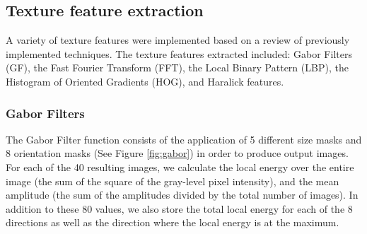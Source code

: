 \subsection{Texture feature extraction}

A variety of texture features were implemented based on a review of previously implemented techniques.
The texture features extracted included: Gabor Filters (GF), the Fast Fourier Transform (FFT), the Local Binary Pattern (LBP), the Histogram of Oriented Gradients (HOG), and Haralick features.

\subsubsection{Gabor Filters}

The Gabor Filter function consists of the application of 5 different size masks and 8 orientation masks (See Figure \ref{fig:gabor}) in order to produce output images. For each of the 40 resulting images, we calculate the local energy over the entire image (the sum of the square of the gray-level pixel intensity), and the mean amplitude (the sum of the amplitudes divided by the total number of images). In addition to these 80 values, we also store the total local energy for each of the 8 directions as well as the direction where the local energy is at the maximum.

  
  
  
  
  
  
  
  
  
